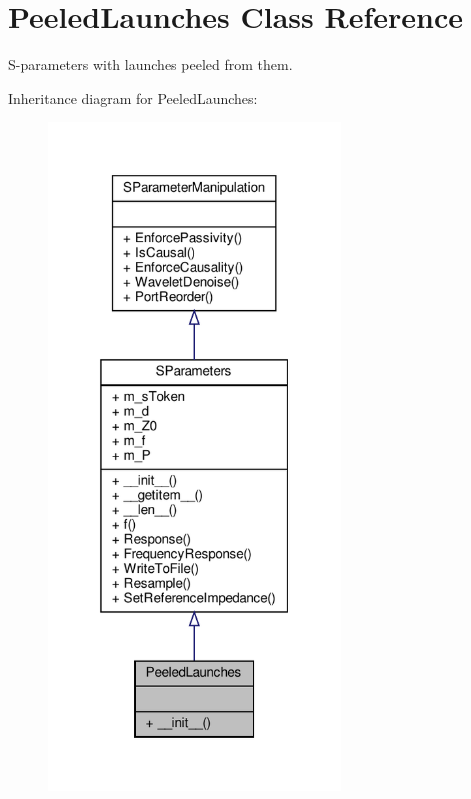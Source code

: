 \hypertarget{classSignalIntegrity_1_1ImpedanceProfile_1_1PeeledLaunches_1_1PeeledLaunches}{}\section{Peeled\+Launches Class Reference}
\label{classSignalIntegrity_1_1ImpedanceProfile_1_1PeeledLaunches_1_1PeeledLaunches}


S-\/parameters with launches peeled from them.  




Inheritance diagram for Peeled\+Launches\+:\nopagebreak
\begin{figure}[H]
\begin{center}
\leavevmode
\includegraphics[width=220pt]{classSignalIntegrity_1_1ImpedanceProfile_1_1PeeledLaunches_1_1PeeledLaunches__inherit__graph}
\end{center}
\end{figure}


